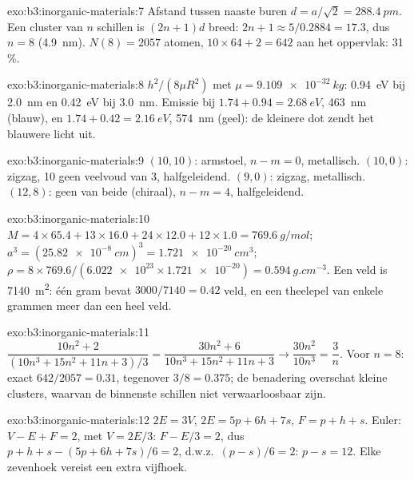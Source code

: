\begin{solution}{exo:b3:inorganic-materials:7}
Afstand tussen naaste buren $d = a/\sqrt2 = \qty{288.4}{pm}$. Een cluster van $n$ schillen is $(2n + 1)d$ breed:
$2n + 1 \approx 5/0.2884 = 17.3$, dus $n = 8$ (\qty{4.9}{nm}). $N(8) = 2057$ atomen, $10 \times 64 + 2 = 642$ aan het oppervlak:
31\,\%.
\end{solution}

\begin{solution}{exo:b3:inorganic-materials:8}
$h^2/(8\mu R^2)$ met $\mu = \qty{9.109e-32}{kg}$: \qty{0.94}{eV} bij \qty{2.0}{nm} en \qty{0.42}{eV} bij \qty{3.0}{nm}. Emissie bij
$1.74 + 0.94 = \qty{2.68}{eV}$, \qty{463}{nm} (blauw), en $1.74 + 0.42 = \qty{2.16}{eV}$, \qty{574}{nm} (geel): de kleinere dot
zendt het blauwere licht uit.
\end{solution}

\begin{solution}{exo:b3:inorganic-materials:9}
$(10, 10)$: armstoel, $n - m = 0$, metallisch. $(10, 0)$: zigzag, 10 geen veelvoud van 3, halfgeleidend.
$(9, 0)$: zigzag, metallisch. $(12, 8)$: geen van beide (chiraal), $n - m = 4$, halfgeleidend.
\end{solution}

\begin{solution}{exo:b3:inorganic-materials:10}
$M = 4 \times 65.4 + 13 \times 16.0 + 24 \times 12.0 + 12 \times 1.0 = \qty{769.6}{g/mol}$; $a^3 = (\qty{25.82e-8}{cm})^3 = \qty{1.721e-20}{cm^3}$;
$\rho = 8 \times 769.6/(\num{6.022e23} \times \num{1.721e-20}) = \qty{0.594}{g.cm^{-3}}$. Een veld is \qty{7140}{m^2}: één gram bevat
$3000/7140 = 0.42$ veld, en een theelepel van enkele grammen meer dan een heel veld.
\end{solution}

\begin{solution}{exo:b3:inorganic-materials:11}
$\dfrac{10n^2 + 2}{(10n^3 + 15n^2 + 11n + 3)/3} = \dfrac{30n^2 + 6}{10n^3 + 15n^2 + 11n + 3} \to \dfrac{30n^2}{10n^3} = \dfrac3n$. Voor $n = 8$: exact
$642/2057 = 0.31$, tegenover $3/8 = 0.375$; de benadering overschat kleine
clusters, waarvan de binnenste schillen niet verwaarloosbaar zijn.
\end{solution}

\begin{solution}{exo:b3:inorganic-materials:12}
$2E = 3V$, $2E = 5p + 6h + 7s$, $F = p + h + s$. Euler: $V - E + F = 2$, met $V = 2E/3$: $F - E/3 = 2$, dus
$p + h + s - (5p + 6h + 7s)/6 = 2$, d.w.z.\ $(p - s)/6 = 2$: $p - s = 12$. Elke zevenhoek vereist een extra
vijfhoek.
\end{solution}

